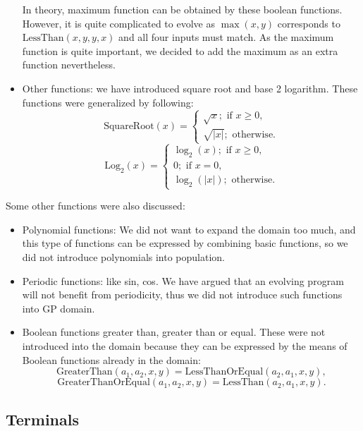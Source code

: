 \begin{itemize}
 	In theory, maximum function can be obtained by these boolean functions. However, it is quite complicated to evolve as $\max(x,y)$ corresponds to $\text{LessThan}(x,y,y,x)$ and all four inputs must match. As the maximum function is quite important, we decided to add the maximum as an extra function nevertheless.
 	\item 	Other functions: we have introduced square root and base 2 logarithm. These functions were generalized by following:
 	\begin{equation*}
 	\text{SquareRoot}(x)=
 	\begin{cases}
 	\sqrt{x}; \text{ if } x \ge 0, \\
 	\sqrt{|x|}; \text{ otherwise}.
 	\end{cases}
 	\end{equation*}
 	\begin{equation*}
 	\text{Log}_2(x)=
 	\begin{cases}
 	\log_2(x); \text{ if } x \ge 0, \\
 	0; \text{ if } x = 0, \\
 	\log_2(|x|); \text{ otherwise}.
 	\end{cases}
 	\end{equation*}
 \end{itemize}
 Some other functions were also discussed:
 \begin{itemize}
 	\item Polynomial functions: We did not want to expand the domain too much, and this type of functions can be expressed by combining basic functions, so we did not introduce polynomials into population.
 	\item Periodic functions: like sin, cos. We have argued that an evolving program will not benefit from periodicity, thus we did not introduce such functions into GP domain.
 	\item Boolean functions greater than, greater than or equal. These were not introduced into the domain because they can be expressed by the means of Boolean functions already in the domain:
 	\begin{equation*}
 	\text{GreaterThan}(a_1,a_2,x,y)=\text{LessThanOrEqual}(a_2,a_1,x,y),
 	\end{equation*}
 	\begin{equation*}
 	\text{GreaterThanOrEqual}(a_1,a_2,x,y)=\text{LessThan}(a_2,a_1,x,y).
 	\end{equation*}
 \end{itemize}
 
 \subsection{Terminals}
 
